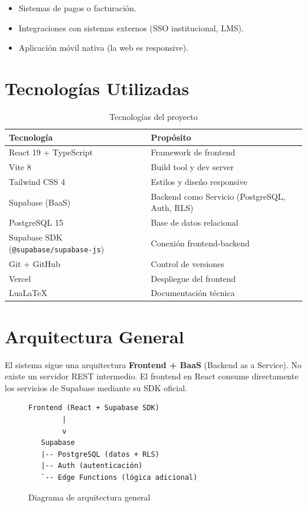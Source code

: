 \begin{itemize}
    \item Sistemas de pagos o facturación.
    \item Integraciones con sistemas externos (SSO institucional, LMS).
    \item Aplicación móvil nativa (la web es responsive).
\end{itemize}

\section{Tecnologías Utilizadas}

\begin{table}[H]
\centering
\begin{tabularx}{\textwidth}{l Y}
\toprule
\textbf{Tecnología} & \textbf{Propósito} \\
\midrule
React 19 + TypeScript & Framework de frontend \\
Vite 8 & Build tool y dev server \\
Tailwind CSS 4 & Estilos y diseño responsive \\
Supabase (BaaS) & Backend como Servicio (PostgreSQL, Auth, RLS) \\
PostgreSQL 15 & Base de datos relacional \\
Supabase SDK (\texttt{@supabase/supabase-js}) & Conexión frontend-backend \\
Git + GitHub & Control de versiones \\
Vercel & Despliegue del frontend \\
LuaLaTeX & Documentación técnica \\
\bottomrule
\end{tabularx}
\caption{Tecnologías del proyecto}
\end{table}

\section{Arquitectura General}

El sistema sigue una arquitectura \textbf{Frontend + BaaS} (Backend as a Service). No existe un servidor REST intermedio. El frontend en React consume directamente los servicios de Supabase mediante su SDK oficial.

\begin{figure}[H]
\centering
\begin{lstlisting}[frame=none, numbers=none, basicstyle=\ttfamily\small]
Frontend (React + Supabase SDK)
        |
        v
   Supabase
   |-- PostgreSQL (datos + RLS)
   |-- Auth (autenticación)
   `-- Edge Functions (lógica adicional)
\end{lstlisting}
\caption{Diagrama de arquitectura general}
\end{figure}

